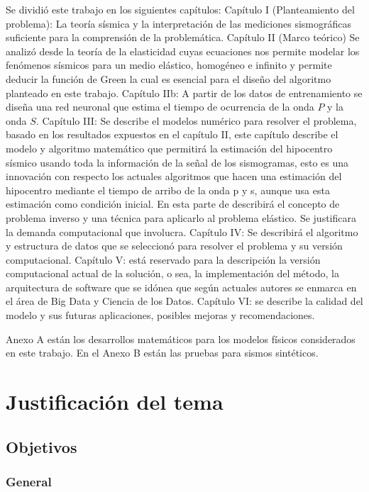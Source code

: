 Se dividió este trabajo en los siguientes capítulos:
Capítulo I (Planteamiento del problema): La teoría sísmica y la interpretación
de las mediciones sismográficas suficiente para la comprensión de la
problemática.
Capítulo II (Marco teórico) Se analizó desde la teoría de la elasticidad cuyas
ecuaciones nos permite modelar los fenómenos sísmicos para un medio elástico,
homogéneo e infinito y permite deducir la función de Green la cual es esencial
para el diseño del algoritmo planteado en este trabajo.
Capítulo IIb: A partir de los datos de entrenamiento se diseña una red neuronal
que estima el tiempo de ocurrencia de la onda $P$ y la onda $S$.
Capítulo III: Se describe el modelos numérico para resolver el problema, basado
en los resultados expuestos en el capítulo II, este capítulo describe el modelo
y algoritmo matemático que permitirá la estimación del hipocentro sísmico usando
toda la información de la señal de los sismogramas, esto es una innovación con
respecto los actuales algoritmos que hacen una estimación del hipocentro
mediante el tiempo de arribo de la onda p y s, aunque usa esta estimación como
condición inicial. En esta parte de describirá el concepto de problema inverso y
una técnica para aplicarlo al problema elástico. Se justificara la demanda
computacional que involucra.
Capítulo IV: Se describirá el algoritmo y estructura de datos que se seleccionó
para resolver el problema y su versión computacional.
Capítulo V: está reservado para la descripción la versión computacional actual
de la solución, o sea, la implementación del método, la arquitectura de software
que se idónea que  según actuales autores se enmarca en el área de Big Data y
Ciencia de los Datos.
Capítulo VI: se describe la calidad del modelo y sus futuras aplicaciones,
posibles mejoras y recomendaciones.

Anexo A están los desarrollos matemáticos para los modelos físicos considerados
en este trabajo. En el Anexo B están las pruebas para sismos sintéticos.

\chapter{Justificación del tema} 

\section{Objetivos}

\subsection{General}

